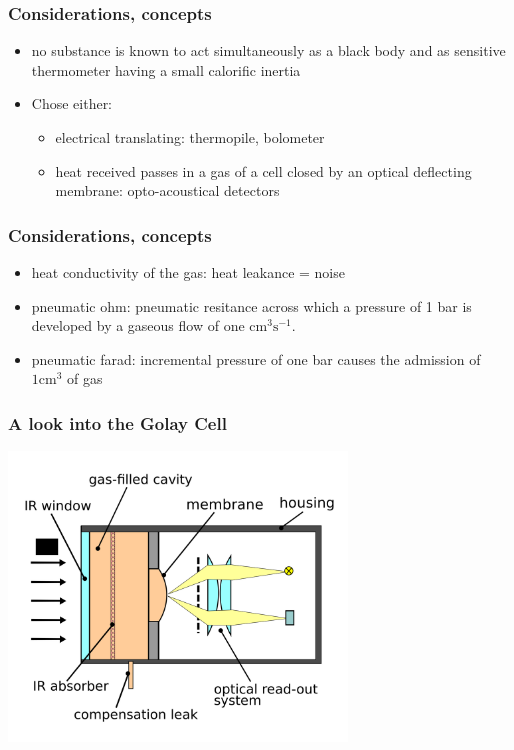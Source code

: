 \documentclass[14pt]{beamer}
\begin{document}
\begin{frame}
\frametitle{Considerations, concepts}
\begin{itemize}
\item \alert{no substance is known to act simultaneously as a black body and as sensitive thermometer having a small calorific inertia}
\item Chose either:
\begin{itemize}
\item electrical translating: thermopile, bolometer
\item heat received passes in a gas of a cell closed by an optical deflecting membrane: opto-acoustical detectors
\end{itemize}

\end{itemize}

\end{frame}
\begin{frame}
\frametitle{Considerations, concepts}
\begin{itemize}
\item heat conductivity of the gas: heat leakance = noise
\item pneumatic ohm: pneumatic resitance across which a pressure of 1 bar is developed by a gaseous flow of one $\mathrm{cm}^3\mathrm{s}^{-1}$.
\item pneumatic farad: incremental pressure of one bar causes the admission of $1 \mathrm{cm}^3$ of gas 
\end{itemize}
\end{frame}
\begin{frame}
\frametitle{A look into the Golay Cell}
\includegraphics[width=9cm]{2000px-Golay_Cell_Schematic.png}
\end{frame}
\end{document}
